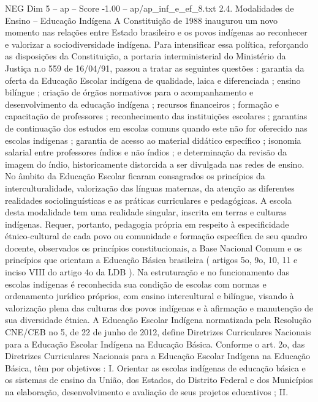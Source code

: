 \begin{textsample}{NEG Dim 5 – ap – Score -1.00 – ap/ap\_inf\_e\_ef\_8.txt}  \label{ex:f5_neg_130}
2.4.
Modalidades de Ensino – Educação Indígena A Constituição de 1988 inaugurou um novo momento nas relações entre Estado brasileiro e os povos indígenas ao reconhecer e valorizar a sociodiversidade indígena.
Para intensificar essa política, reforçando as disposições da Constituição, a portaria interministerial do Ministério da Justiça n.o 559 de 16/04/91, passou a tratar as seguintes questões : garantia da oferta da Educação Escolar indígena de qualidade, laica e diferenciada ; ensino bilíngue ; criação de órgãos normativos para o acompanhamento e desenvolvimento da educação indígena ; recursos financeiros ; formação e capacitação de professores ; reconhecimento das instituições escolares ; garantias de continuação dos estudos em escolas comuns quando este não for oferecido nas escolas indígenas ; garantia de acesso ao material didático específico ; isonomia salarial entre professores índios e não índios ; e determinação da revisão da imagem do índio, historicamente distorcida a ser divulgada nas redes de ensino.
No âmbito da Educação Escolar ficaram consagrados os princípios da interculturalidade, valorização das línguas maternas, da atenção as diferentes realidades sociolinguísticas e as práticas curriculares e pedagógicas.
A escola desta modalidade tem uma realidade singular, inscrita em terras e culturas indígenas.
Requer, portanto, pedagogia própria em respeito à especificidade étnico-cultural de cada povo ou comunidade e formação específica de seu quadro docente, observados os princípios constitucionais, a Base Nacional Comum e os princípios que orientam a Educação Básica brasileira ( artigos 5o, 9o, 10, 11 e inciso VIII do artigo 4o da LDB ).
Na estruturação e no funcionamento das escolas indígenas é reconhecida sua condição de escolas com normas e ordenamento jurídico próprios, com ensino intercultural e bilíngue, visando à valorização plena das culturas dos povos indígenas e à afirmação e manutenção de sua diversidade étnica.
A Educação Escolar Indígena normatizada pela Resolução CNE/CEB no 5, de 22 de junho de 2012, define Diretrizes Curriculares Nacionais para a Educação Escolar Indígena na Educação Básica.
Conforme o art. 2o, das Diretrizes Curriculares Nacionais para a Educação Escolar Indígena na Educação Básica, têm por objetivos : I.
Orientar as escolas indígenas de educação básica e os sistemas de ensino da União, dos Estados, do Distrito Federal e dos Municípios na elaboração, desenvolvimento e avaliação de seus projetos educativos ; II.

\end{textsample}
